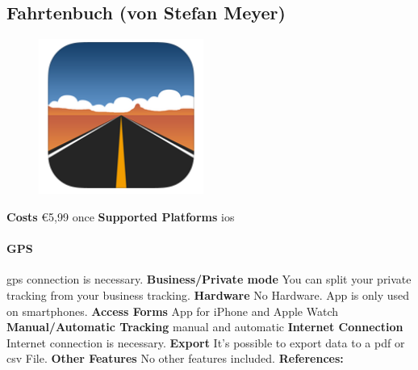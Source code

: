 \begin{singlespace}
\section{Fahrtenbuch (von Stefan Meyer)}
\begin{figure}
  \begin{center}
    \includegraphics[width=0.48\textwidth]{bilder/fahrtenbuch}
  \end{center}
\end{figure}
\textbf{Costs} \euro 5,99 once
\newline\newline
\textbf{Supported Platforms} \gls{ios}
\paragraph{GPS} \gls{gps} connection is necessary.
\newline\newline
\textbf{Business/Private mode} You can split your private tracking from your business tracking.
\newline\newline
\textbf{Hardware} No Hardware. App is only used on smartphones.
\newline\newline
\textbf{Access Forms} App for iPhone and Apple Watch
\newline\newline
\textbf{Manual/Automatic Tracking} manual and automatic
\newline\newline
\textbf{Internet Connection} Internet connection is necessary.
\newline\newline
\textbf{Export} It’s possible to export data to a \gls{pdf} or \gls{csv} File.
\newline\newline
\textbf{Other Features} No other features included.
\newline\newline
\textbf{References:} \cite{Fahrtenbuch_von_Stefan_Meyer}
\newpage


\end{singlespace}
